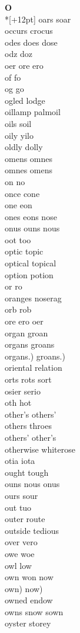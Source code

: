 \vspace{14pt}
\noindent\textbf{\Large O}\\*[+12pt]
oars soar\\
occurs crocus\\
odes does dose\\
odz doz\\
oer ore ero\\
of fo\\
og go\\
ogled lodge\\
oillamp palmoil\\
oils soil\\
oily yilo\\
oldly dolly\\
omens omnes\\
omnes omens\\
on no\\
once cone\\
one eon\\
ones eons nose\\
onus ouns nous\\
oot too\\
optic topic\\
optical topical\\
option potion\\
or ro\\
oranges noserag\\
orb rob\\
ore ero oer\\
organ groan\\
organs groans\\
organs.) groans.)\\
oriental relation\\
orts rots sort\\
osier serio\\
oth hot\\
other's others'\\
others throes\\
others' other's\\
otherwise whiterose\\
otia iota\\
ought tough\\
ouns nous onus\\
ours sour\\
out tuo\\
outer route\\
outside tedious\\
over vero\\
owe woe\\
owl low\\
own won now\\
own) now)\\
owned endow\\
owns snow sown\\
oyster storey\\

